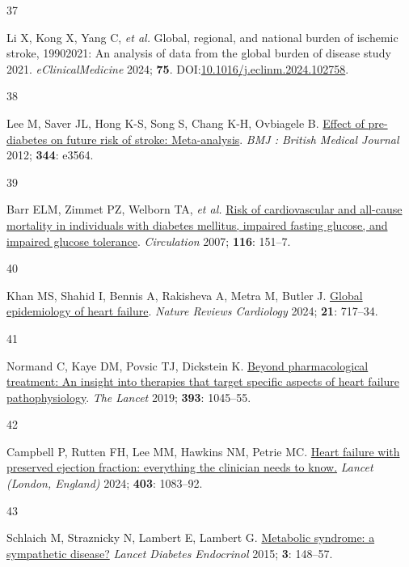\documentclass[
  a4paper,
  headsepline=true,
  open=any]{scrbook}
\newlength{\cslhangindent}
\newlength{\csllabelwidth}
\newlength{\cslentryspacingunit} %
\newenvironment{CSLReferences}[2] %
 {%
  \setlength{\parindent}{0pt}
  \ifodd #1
  \let\oldpar\par
  \def\par{\hangindent=\cslhangindent\oldpar}
  \fi
  \setlength{\parskip}{#2\cslentryspacingunit}
 }%
 {}
\newcommand{\CSLLeftMargin}[1]{\parbox[t]{\csllabelwidth}{#1}}
\newcommand{\CSLRightInline}[1]{\parbox[t]{\linewidth - \csllabelwidth}{#1}\break}
\begin{document}
\begin{CSLReferences}{0}{0}
\leavevmode{}%
\CSLLeftMargin{37 }%
\CSLRightInline{Li X, Kong X, Yang C, \emph{et al.} Global, regional,
and national burden of ischemic stroke, 1990{\textendash}2021: An
analysis of data from the global burden of disease study 2021.
\emph{eClinicalMedicine} 2024; \textbf{75}.
DOI:\href{https://doi.org/10.1016/j.eclinm.2024.102758}{10.1016/j.eclinm.2024.102758}.}

\leavevmode{}%
\CSLLeftMargin{38 }%
\CSLRightInline{Lee M, Saver JL, Hong K-S, Song S, Chang K-H, Ovbiagele
B. \href{https://doi.org/10.1136/bmj.e3564}{Effect of pre-diabetes on
future risk of stroke: Meta-analysis}. \emph{BMJ : British Medical
Journal} 2012; \textbf{344}: e3564.}

\leavevmode{}%
\CSLLeftMargin{39 }%
\CSLRightInline{Barr ELM, Zimmet PZ, Welborn TA, \emph{et al.}
\href{https://doi.org/10.1161/CIRCULATIONAHA.106.685628}{Risk of
cardiovascular and all-cause mortality in individuals with diabetes
mellitus, impaired fasting glucose, and impaired glucose tolerance}.
\emph{Circulation} 2007; \textbf{116}: 151--7.}

\leavevmode{}%
\CSLLeftMargin{40 }%
\CSLRightInline{Khan MS, Shahid I, Bennis A, Rakisheva A, Metra M,
Butler J. \href{https://doi.org/10.1038/s41569-024-01046-6}{Global
epidemiology of heart failure}. \emph{Nature Reviews Cardiology} 2024;
\textbf{21}: 717--34.}

\leavevmode{}%
\CSLLeftMargin{41 }%
\CSLRightInline{Normand C, Kaye DM, Povsic TJ, Dickstein K.
\href{https://doi.org/10.1016/S0140-6736(18)32216-5}{Beyond
pharmacological treatment: An insight into therapies that target
specific aspects of heart failure pathophysiology}. \emph{The Lancet}
2019; \textbf{393}: 1045--55.}

\leavevmode{}%
\CSLLeftMargin{42 }%
\CSLRightInline{Campbell P, Rutten FH, Lee MM, Hawkins NM, Petrie MC.
\href{https://doi.org/10.1016/S0140-6736(23)02756-3}{Heart failure with
preserved ejection fraction: everything the clinician needs to know.}
\emph{Lancet (London, England)} 2024; \textbf{403}: 1083--92.}

\leavevmode{}%
\CSLLeftMargin{43 }%
\CSLRightInline{Schlaich M, Straznicky N, Lambert E, Lambert G.
\href{https://doi.org/10.1016/s2213-8587(14)70033-6}{Metabolic syndrome:
a sympathetic disease?} \emph{Lancet Diabetes Endocrinol} 2015;
\textbf{3}: 148--57.}


\end{CSLReferences}
\end{document}
